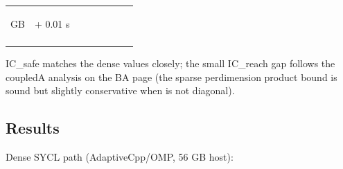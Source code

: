 \documentclass[a4paper,10pt,english]{sphinxmanual}
\begin{document}
\begin{savenotes}
\begin{tabulary}{\linewidth}[t]{TTTTTTTT}
\begin{varwidth}[t]{}
 GB
\sphinxbeforeendvarwidth
\end{varwidth}%
&\begin{varwidth}[t]{}
 + 0.01 s
\sphinxbeforeendvarwidth
\end{varwidth}%
&\begin{varwidth}[t]{}
\sphinxbeforeendvarwidth
\end{varwidth}%
&\begin{varwidth}[t]{}
\sphinxbeforeendvarwidth
\end{varwidth}%
\\
\sphinxbottomrule
\end{tabulary}
\sphinxtableafterendhook\par
\sphinxattableend\end{savenotes}

\sphinxAtStartPar
IC\_safe matches the dense values closely; the small IC\_reach gap follows the coupled\sphinxhyphen{}A
analysis on the BA page (the sparse per\sphinxhyphen{}dimension product bound is sound but slightly
conservative when  is not diagonal).


\subsection{Results}
\label{\detokenize{benchmarks/IC:results}}
\sphinxAtStartPar
Dense SYCL path (AdaptiveCpp/OMP, 56 GB host):
\end{document}
